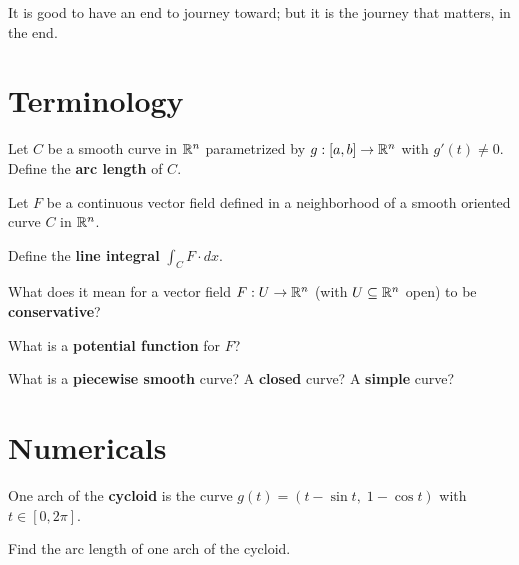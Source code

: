 \documentclass{homework}
\author{Jim Fowler}
\begin{document}
\maketitle

\begin{inspiration}
It is good to have an end to journey toward; but it is the journey that matters, in the end.
\end{inspiration}

\section{Terminology}

\begin{problem}
  Let $C$ be a smooth curve in $\mathbb{R}^n$ parametrized by $g:[a,b]\to\mathbb{R}^n$ with $g'(t)\neq 0$.
  Define the \textbf{arc length} of $C$.
\end{problem}

\begin{problem}\label{line-integral-definition}%
  Let $F$ be a continuous vector field defined in a neighborhood of a smooth oriented curve $C$ in $\mathbb{R}^n$.
  
  Define the \textbf{line integral} $\displaystyle\int_C F\cdot dx$.
\end{problem}

\begin{problem}\label{conservative-definition}%
  What does it mean for a vector field $F:U\to\mathbb{R}^n$ (with $U\subseteq\mathbb{R}^n$ open) to be \textbf{conservative}?
\end{problem}

\begin{problem}\label{potential-definition}%
  What is a \textbf{potential function} for $F$?
\end{problem}

\begin{problem}
  What is a \textbf{piecewise smooth} curve?  A \textbf{closed} curve?  A \textbf{simple} curve?
\end{problem}


\section{Numericals}

\begin{problem}
  One arch of the \textbf{cycloid} is the curve
  $g(t)=(t-\sin t,\; 1-\cos t)$ with $t\in[0,2\pi]$.

  Find the arc length of one arch of the cycloid.
\end{problem}
\end{document}

